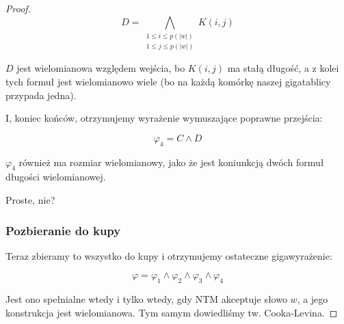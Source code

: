 \begin{proof}
	\[
		D = \bigwedge_{\substack{1 \leq i \leq p(|w|) \\ 1 \leq j \leq p(|w|)}} K(i,j)
	\]

	\(D\) jest wielomianowa względem wejścia, bo \(K(i,j)\) ma stałą długość, a z kolei tych formuł jest wielomianowo wiele (bo na każdą komórkę naszej gigatablicy przypada jedna).

	I, koniec końców, otrzymujemy wyrażenie wymuszające poprawne przejścia:

	\[
		\varphi_4 = C \land D
	\]

	\(\varphi_4\) również ma rozmiar wielomianowy, jako że jest koniunkcją dwóch formuł długości wielomianowej.

	Proste, nie?

	\subsubsection{Pozbieranie do kupy}

	Teraz zbieramy to wszystko do kupy i otrzymujemy ostateczne gigawyrażenie:

	\[
		\varphi = \varphi_1 \land \varphi_2 \land \varphi_3 \land \varphi_4
	\]

	Jest ono spełnialne wtedy i tylko wtedy, gdy NTM akceptuje słowo \(w\), a jego konstrukcja jest wielomianowa. Tym samym dowiedliśmy tw. Cooka-Levina.
\end{proof}